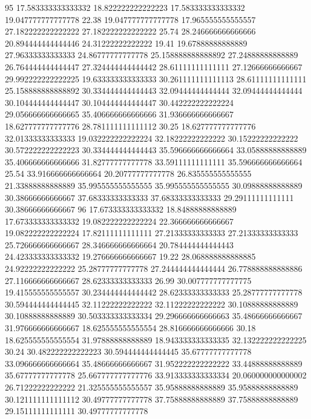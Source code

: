 95 17.583333333333332 18.822222222222223 17.583333333333332 19.047777777777778 22.38 19.047777777777778 17.965555555555557 27.182222222222222 27.182222222222222 25.74 28.246666666666666 20.894444444444446 24.31222222222222 19.41 19.67888888888889 27.96333333333333 24.86777777777778 25.158888888888892 27.24888888888889 26.764444444444447 27.324444444444442 28.61111111111111 27.12666666666667 29.992222222222225 19.633333333333333 30.261111111111113 28.61111111111111 25.158888888888892 30.334444444444443 32.09444444444444 32.09444444444444 30.104444444444447 30.104444444444447 30.442222222222224 29.056666666666665 35.406666666666666 31.936666666666667 18.627777777777776 28.781111111111112 30.25 18.627777777777776 32.01333333333333 19.032222222222224 32.18222222222222 30.15222222222222 30.572222222222223 30.334444444444443 35.596666666666664 33.05888888888889 35.406666666666666 31.82777777777778 33.59111111111111 35.596666666666664 25.54 33.916666666666664 20.20777777777778 26.835555555555555 21.33888888888889 35.995555555555555 35.995555555555555 30.09888888888889 30.38666666666667 37.68333333333333 37.68333333333333 29.29111111111111 30.38666666666667
96 17.673333333333332 18.84888888888889 17.673333333333332 19.082222222222224 22.366666666666667 19.082222222222224 17.82111111111111 27.21333333333333 27.21333333333333 25.726666666666667 28.346666666666664 20.784444444444443 24.423333333333332 19.276666666666667 19.22 28.068888888888885 24.92222222222222 25.28777777777778 27.244444444444444 26.778888888888886 27.116666666666667 28.62333333333333 26.99 30.007777777777775 19.415555555555557 30.234444444444442 28.62333333333333 25.28777777777778 30.594444444444445 32.11222222222222 32.11222222222222 30.10888888888889 30.10888888888889 30.503333333333334 29.296666666666663 35.48666666666667 31.976666666666667 18.625555555555554 28.816666666666666 30.18 18.625555555555554 31.97888888888889 18.943333333333335 32.132222222222225 30.24 30.482222222222223 30.594444444444445 35.67777777777778 33.096666666666664 35.48666666666667 31.952222222222222 33.44888888888889 35.67777777777778 25.667777777777776 33.913333333333334 20.060000000000002 26.71222222222222 21.325555555555557 35.95888888888889 35.95888888888889 30.121111111111112 30.49777777777778 37.75888888888889 37.75888888888889 29.15111111111111 30.49777777777778
